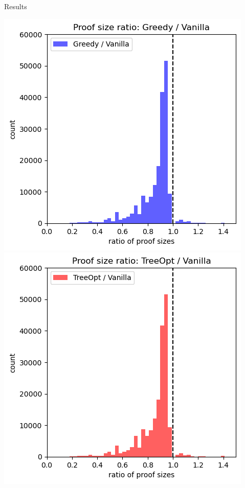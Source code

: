 \documentclass[aspectratio=169]{beamer}
\begin{document}
\begin{frame}{Results}
  \centerline{
  \includegraphics[width=0.45 \textwidth]{images/proof-ratio-hist-greedy.png}
  \includegraphics[width=0.45 \textwidth]{images/proof-ratio-hist-treeopt.png}
  }
\end{frame}
\end{document}
